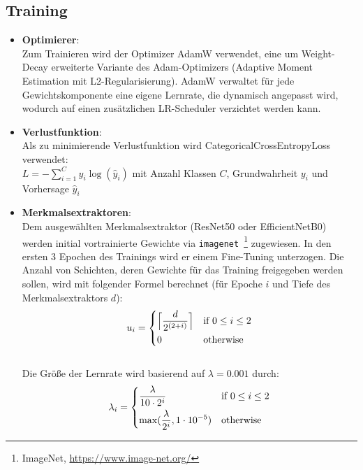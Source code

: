 \documentclass{article}
\newcommand{\resnet}{ResNet50\xspace}
\newcommand{\effnet}{EfficientNetB0\xspace}
\begin{document}
    \subsection{Training}
    \begin{itemize}
        \item\textbf{Optimierer}:
            \\Zum Trainieren wird der Optimizer AdamW verwendet, eine um Weight-Decay erweiterte Variante des Adam-Optimizers (Adaptive Moment Estimation mit L2-Regularisierung).
            AdamW verwaltet für jede Gewichtskomponente eine eigene Lernrate, die dynamisch angepasst wird, wodurch auf einen zusätzlichen LR-Scheduler verzichtet werden kann.
        \item\textbf{Verlustfunktion}:
            \\Als zu minimierende Verlustfunktion wird CategoricalCrossEntropyLoss verwendet:
            \\$\displaystyle L=-\sum_{i=1}^Cy_i\log(\hat y_i)$ mit Anzahl Klassen $C$, Grundwahrheit $y_i$ und Vorhersage $\hat y_i$
        \item\textbf{Merkmalsextraktoren}:
            \\Dem ausgewählten Merkmalsextraktor (\resnet oder \effnet) werden initial vortrainierte Gewichte via \texttt{imagenet}~\footnote{ImageNet, \url{https://www.image-net.org/}} zugewiesen.
            In den ersten 3 Epochen des Trainings wird er einem Fine-Tuning unterzogen.
            Die Anzahl von Schichten, deren Gewichte für das Training freigegeben werden sollen, wird mit folgender Formel berechnet (für Epoche $i$ und Tiefe des Merkmalsextraktors $d$):
            \\\[
                u_i= 
            \begin{dcases}
                \Big\lceil\frac{d}{2^{(2+i)}}\Big\rceil & \text{if } 0\le i \le 2\\
                0 & \text{otherwise}
            \end{dcases}
            \]
            \\Die Größe der Lernrate wird basierend auf $\lambda=0.001$ durch:
            \\\[
                \lambda_i= 
            \begin{dcases}
                \frac{\lambda}{10\cdot 2^i} & \text{if } 0\le i \le 2\\
                \max(\frac{\lambda}{2^i}, 1\cdot 10^{-5}) & \text{otherwise}

\end{dcases}\]
\end{itemize}
\end{document}
